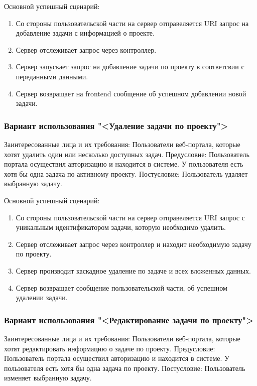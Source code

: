Основной успешный сценарий:
\begin{enumerate}
	\item Со стороны пользовательской части на сервер отправеляется URI запрос на добавление задачи с информацией о проекте.
	\item Сервер отслеживает запрос через контроллер.
	\item Сервер запускает запрос на добавление задачи по проекту в соответсвии с переданными данными.
	\item Сервер возвращает на frontend сообщение об успешном добавлении новой задачи.
\end{enumerate}

\subsubsection{Вариант использования "<Удаление задачи по проекту">}

Заинтересованные лица и их требования: Пользователи веб-портала, которые хотят удалить один или несколько доступных задач.
Предусловие: Пользователь портала осуществил авторизацию и находится в системе. У пользователя есть хотя бы одна задача по активному проекту. Постусловие: Пользователь удаляет выбранную задачу.

Основной успешный сценарий:
\begin{enumerate}
	\item Со стороны пользовательской части на сервер отправеляется URI запрос с уникальным идентификатором задачи, которую необходимо удалить.
	\item Сервер отслеживает запрос через контроллер и находит необходимую задачу по проекту.
	\item Сервер производит каскадное удаление по задаче и всех вложенных данных. 
	\item Сервер возвращает сообщение пользовательской части, об успешном удалении задачи.
\end{enumerate}

\subsubsection{Вариант использования "<Редактирование задачи по проекту">}

Заинтересованные лица и их требования: Пользователи веб-портала, которые хотят редактировать информацию о задаче по проекту.
Предусловие: Пользователь портала осуществил авторизацию и находится в системе. У пользователя есть хотя бы одна задача по проекту. Постусловие: Пользователь изменяет выбранную задачу.

